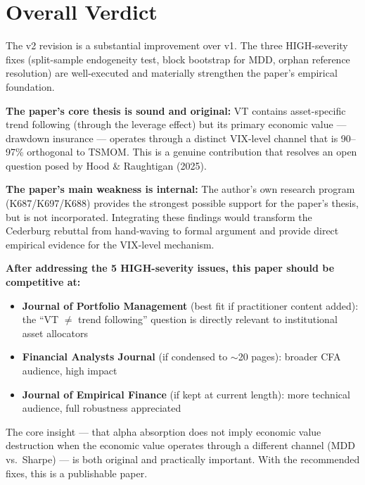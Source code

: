 \documentclass[12pt,a4paper]{article}
\begin{document}
\section{Overall Verdict}

The v2 revision is a substantial improvement over v1. The three HIGH-severity fixes (split-sample endogeneity test, block bootstrap for MDD, orphan reference resolution) are well-executed and materially strengthen the paper's empirical foundation.

\textbf{The paper's core thesis is sound and original:} VT contains asset-specific trend following (through the leverage effect) but its primary economic value --- drawdown insurance --- operates through a distinct VIX-level channel that is 90--97\% orthogonal to TSMOM. This is a genuine contribution that resolves an open question posed by Hood \& Raughtigan (2025).

\textbf{The paper's main weakness is internal:} The author's own research program (K687/K697/K688) provides the strongest possible support for the paper's thesis, but is not incorporated. Integrating these findings would transform the Cederburg rebuttal from hand-waving to formal argument and provide direct empirical evidence for the VIX-level mechanism.

\textbf{After addressing the 5 HIGH-severity issues, this paper should be competitive at:}
\begin{itemize}
\item \textbf{Journal of Portfolio Management} (best fit if practitioner content added): the ``VT $\neq$ trend following'' question is directly relevant to institutional asset allocators
\item \textbf{Financial Analysts Journal} (if condensed to $\sim$20 pages): broader CFA audience, high impact
\item \textbf{Journal of Empirical Finance} (if kept at current length): more technical audience, full robustness appreciated
\end{itemize}

The core insight --- that alpha absorption does not imply economic value destruction when the economic value operates through a different channel (MDD vs.\ Sharpe) --- is both original and practically important. With the recommended fixes, this is a publishable paper.
\end{document}
